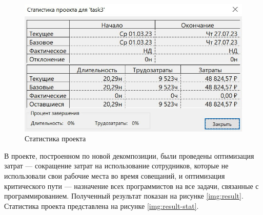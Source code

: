 \begin{figure}[H]
	\begin{center}
		\includegraphics[scale=0.4]{inc/img/lab3-stat.jpg}
	\end{center}
	\captionsetup{justification=centering}
	\caption{Статистика проекта}
	\label{img:lab3-stat}
\end{figure}

В проекте, построенном по новой декомпозиции, были проведены оптимизация затрат --- сокращение затрат на использование сотрудников, которые не использовали свои рабочие места во время совещаний, и оптимизация критического пути --- назначение всех программистов на все задачи, связанные с программированием. Полученный результат показан на рисунке \ref{img:result}. Статистика проекта представлена на рисунке \ref{img:result-stat}.

